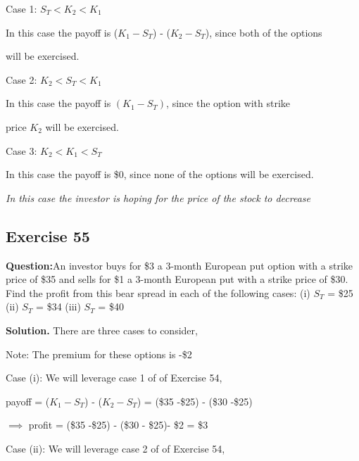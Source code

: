 \documentclass{article}
\begin{document}
\vspace{\baselineskip}

Case 1: $S_T < K_2 < K_1$

In this case the payoff is ($K_1 - S_T$) - ($K_2 - S_T$), since both of the options 

will be exercised.

\vspace{\baselineskip}

Case 2: $K_2 < S_T < K_1$

In this case the payoff is $ (K_1 - S_T)$, since the option with strike 

price $K_2$ will be exercised.

\vspace{\baselineskip}

Case 3: $K_2 < K_1 < S_T$

In this case the payoff is \$0, since none of the options will be exercised.

\vspace{\baselineskip}

\textit{In this case the investor is hoping for the price of the stock to decrease}

\subsection*{Exercise 55}
\textbf{Question:}An investor buys for \$3 a 3-month European put option with a strike price of \$35 and sells for \$1
a 3-month European put with a strike price of \$30. Find the profit from this bear spread in each of the following
cases:
(i) $S_T$ = \$25
(ii) $S_T$ = \$34
(iii) $S_T$ = \$40

\vspace{\baselineskip}

\textbf{Solution.} There are three cases to consider,

Note: The premium for these options is -\$2

\vspace{\baselineskip}

Case (i):
We will leverage case 1 of of Exercise 54,

payoff = ($K_1 - S_T$) - ($K_2 - S_T$) =  (\$35 -\$25) - (\$30 -\$25)

$\implies$ profit = (\$35 -\$25) - (\$30 - \$25)- \$2 = \$3

\vspace{\baselineskip}

Case (ii):
We will leverage case 2 of of Exercise 54,
\end{document}
